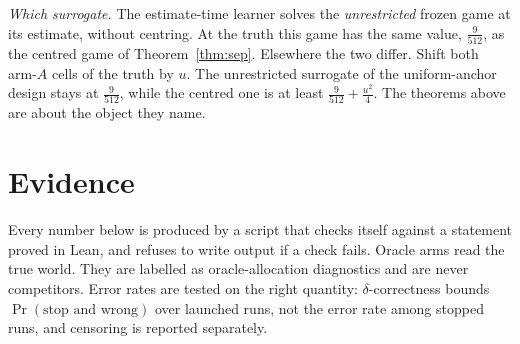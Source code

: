 \emph{Which surrogate.} The estimate-time learner solves the \emph{unrestricted} frozen game at
its estimate, without centring. At the truth this game has the same value, $\frac{9}{512}$, as
the centred game of Theorem~\ref{thm:sep}. Elsewhere the two differ. Shift both arm-$A$ cells
of the truth by $u$. The unrestricted surrogate of the uniform-anchor design stays at
$\frac{9}{512}$, while the centred one is at least $\frac{9}{512}+\frac{u^{2}}{4}$. The
theorems above are about the object they name.


\section{Evidence}
\label{sec:evidence}

Every number below is produced by a script that checks itself against a statement proved in
Lean, and refuses to write output if a check fails. Oracle arms read the true world. They are
labelled as oracle-allocation diagnostics and are never competitors. Error rates are tested on
the right quantity: $\delta$-correctness bounds $\Pr(\text{stop and wrong})$ over launched runs,
not the error rate among stopped runs, and censoring is reported separately.

\begin{table}[t]
\caption{Evidence packages. Each script self-checks against a Lean statement.}
\label{tab:evidence}
\centering
\footnotesize
{}
\end{table}


